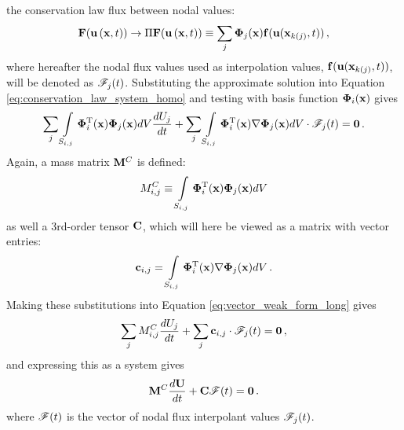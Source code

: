 the conservation law flux between nodal values:
\begin{equation}
  \consfluxvector(\vectorsolution\xt) \rightarrow
  \Pi\consfluxvector(\vectorsolution\xt) 
    \equiv \sumj\vectortestfunction_j(\x)\mathbf{\consfluxletter}
      (\vectorsolution(\x_{\nodeindex(j)},\timevalue))
  \eqc
\end{equation}
where hereafter the nodal flux values used as interpolation values,
$\mathbf{f}(\mathbf{u}(\mathbf{x}_{k(j)},t))$,
will be denoted as $\mathscr{F}_j(t)$.
Substituting the approximate
solution into Equation \eqref{eq:conservation_law_system_homo} and testing with basis
function $\mathbf{\Phi}_i(\mathbf{x})$ gives
\begin{equation}\label{eq:vector_weak_form_long}
   \sum\limits_j\int\limits_{S_{i,j}}\mathbf{\Phi}_i^{\text{T}}(\mathbf{x})\mathbf{\Phi}_j(\mathbf{x}) dV
     \frac{dU_j}{dt}
     + \sum\limits_j\int\limits_{S_{i,j}}\mathbf{\Phi}_i^{\text{T}}(\mathbf{x})\nabla\mathbf{\Phi}_j(\mathbf{x})
     dV\cdot\mathscr{F}_j(t) = \mathbf{0} \,.
\end{equation}
Again, a mass matrix $\mathbf{M}^C$ is defined:
\begin{equation}
  M^C_{i,j} \equiv
    \int\limits_{S_{i,j}}\mathbf{\Phi}_i^{\text{T}}(\mathbf{x})\mathbf{\Phi}_j(\mathbf{x}) dV
\end{equation}
as well a 3rd-order tensor $\gradientmatrix$, which will here be viewed as a
matrix with vector entries:
\begin{equation}
  \mathbf{c}_{i,j} =
    \int\limits_{S_{i,j}}\mathbf{\Phi}_i^{\text{T}}(\mathbf{x})
      \nabla\mathbf{\Phi}_j(\mathbf{x}) dV
  \,.
\end{equation}
Making these substitutions into Equation \eqref{eq:vector_weak_form_long} gives
\begin{equation}\label{eq:vector_weak_form}
   \sum\limits_jM^C_{i,j}\frac{dU_j}{dt}
     + \sum\limits_j\mathbf{c}_{i,j}\cdot\mathscr{F}_j(t)
     = \mathbf{0} \,,
\end{equation}
and expressing this as a system gives
\begin{equation}
  \consistentmassmatrix\ddt{\solutionvector}
    + \gradientmatrix\consfluxinterpolant(\timevalue) = \mathbf{0}
  \eqp
\end{equation}
where $\mathscr{F}(t)$ is the vector of nodal flux interpolant values
$\mathscr{F}_j(t)$.
